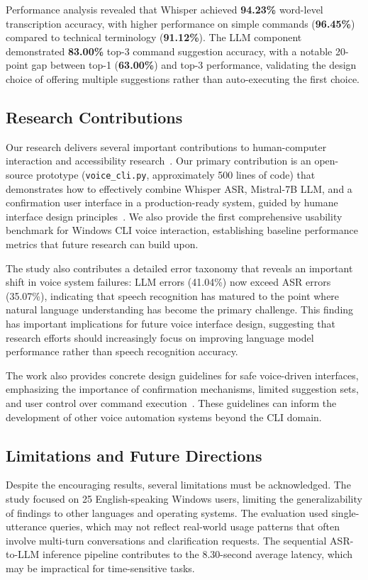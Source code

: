 \documentclass[a4paper,12pt]{article}
\begin{document}
Performance analysis revealed that Whisper achieved \textbf{94.23\%} word-level transcription accuracy, with higher performance on simple commands (\textbf{96.45\%}) compared to technical terminology (\textbf{91.12\%}). The LLM component demonstrated \textbf{83.00\%} top-3 command suggestion accuracy, with a notable 20-point gap between top-1 (\textbf{63.00\%}) and top-3 performance, validating the design choice of offering multiple suggestions rather than auto-executing the first choice.

\subsection{Research Contributions}

Our research delivers several important contributions to human-computer interaction and accessibility research~\cite{ref16,ref22}. Our primary contribution is an open-source prototype (\texttt{voice\_cli.py}, approximately 500 lines of code) that demonstrates how to effectively combine Whisper ASR, Mistral-7B LLM, and a confirmation user interface in a production-ready system, guided by humane interface design principles~\cite{ref20}. We also provide the first comprehensive usability benchmark for Windows CLI voice interaction, establishing baseline performance metrics that future research can build upon.

The study also contributes a detailed error taxonomy that reveals an important shift in voice system failures: LLM errors (41.04\%) now exceed ASR errors (35.07\%), indicating that speech recognition has matured to the point where natural language understanding has become the primary challenge. This finding has important implications for future voice interface design, suggesting that research efforts should increasingly focus on improving language model performance rather than speech recognition accuracy.

The work also provides concrete design guidelines for safe voice-driven interfaces, emphasizing the importance of confirmation mechanisms, limited suggestion sets, and user control over command execution~\cite{ref25}. These guidelines can inform the development of other voice automation systems beyond the CLI domain.

\subsection{Limitations and Future Directions}

Despite the encouraging results, several limitations must be acknowledged. The study focused on 25 English-speaking Windows users, limiting the generalizability of findings to other languages and operating systems. The evaluation used single-utterance queries, which may not reflect real-world usage patterns that often involve multi-turn conversations and clarification requests. The sequential ASR-to-LLM inference pipeline contributes to the 8.30-second average latency, which may be impractical for time-sensitive tasks.
\end{document}
